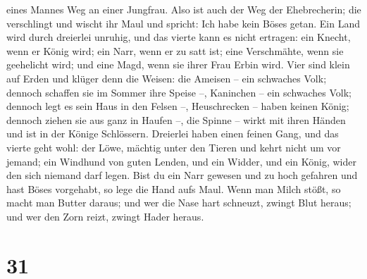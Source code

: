 eines Mannes Weg an einer Jungfrau.  Also ist auch der
Weg der Ehebrecherin; die verschlingt und wischt ihr Maul und spricht:
Ich habe kein Böses getan.  Ein Land wird durch dreierlei
unruhig, und das vierte kann es nicht ertragen:  ein
Knecht, wenn er König wird; ein Narr, wenn er zu satt ist;
 eine Verschmähte, wenn sie geehelicht wird; und eine
Magd, wenn sie ihrer Frau Erbin wird.  Vier sind klein
auf Erden und klüger denn die Weisen:  die Ameisen -- ein
schwaches Volk; dennoch schaffen sie im Sommer ihre Speise --,
 Kaninchen -- ein schwaches Volk; dennoch legt es sein
Haus in den Felsen --,  Heuschrecken -- haben keinen
König; dennoch ziehen sie aus ganz in Haufen --,  die
Spinne -- wirkt mit ihren Händen und ist in der Könige Schlössern.
 Dreierlei haben einen feinen Gang, und das vierte geht
wohl:  der Löwe, mächtig unter den Tieren und kehrt nicht
um vor jemand;  ein Windhund von guten Lenden, und ein
Widder, und ein König, wider den sich niemand darf legen.
 Bist du ein Narr gewesen und zu hoch gefahren und hast
Böses vorgehabt, so lege die Hand aufs Maul.  Wenn man
Milch stößt, so macht man Butter daraus; und wer die Nase hart schneuzt,
zwingt Blut heraus; und wer den Zorn reizt, zwingt Hader heraus.

\hypertarget{section-30}{%
\section{31}\label{section-30}}

